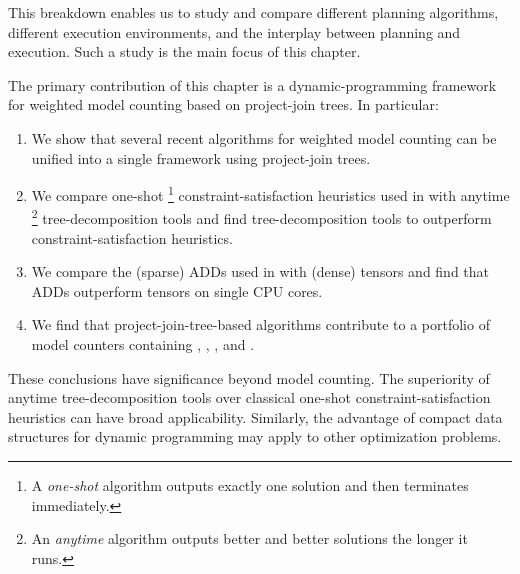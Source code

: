 This breakdown enables us to study and compare different planning algorithms, different execution environments, and the interplay between planning and execution.
Such a study is the main focus of this chapter. %

The primary contribution of this chapter is a dynamic-programming framework for weighted model counting based on project-join trees.
In particular:
\begin{enumerate}
    \item We show that several recent algorithms for weighted model counting \cite{DPV20,fichte2020exploiting} can be unified into a single framework using project-join trees.
    \item We compare one-shot%
    \footnote{A \emph{one-shot} algorithm outputs exactly one solution and then terminates immediately.}
    constraint-satisfaction heuristics \cite{dechter03} used in \cite{DPV20} with anytime%
    \footnote{An \emph{anytime} algorithm outputs better and better solutions the longer it runs.} tree-decomposition tools \cite{MPPV04,AMW17,HS18,Tamaki17} and find tree-decomposition tools to outperform constraint-satisfaction heuristics. %
    \item We compare the (sparse) ADDs \cite{bahar1997algebraic} used in \cite{DPV20} with (dense) tensors \cite{KKCLA17} and find that ADDs outperform tensors on single CPU cores.
    \item We find that project-join-tree-based algorithms contribute to a portfolio of model counters containing \cachet{} \cite{sang2004combining}, \ctd{} \cite{darwiche2004new}, \df{} \cite{LM17}, and \minictd{} \cite{OD15}.
\end{enumerate}
These conclusions have significance beyond model counting.
The superiority of anytime tree-decomposition tools over classical one-shot constraint-satisfaction heuristics can have broad applicability.
Similarly, the advantage of compact data structures for dynamic programming may apply to other optimization problems.


